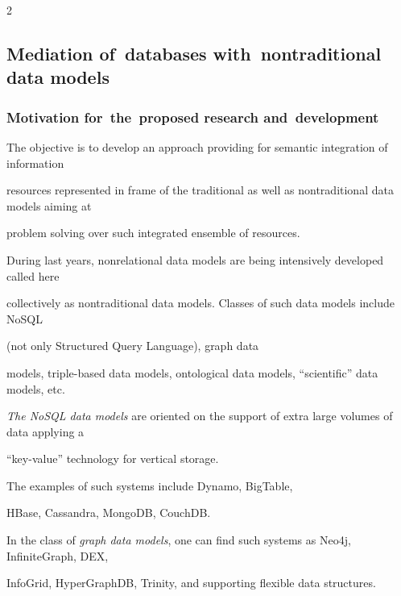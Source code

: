\begin{multicols}{2}
\begin{enumerate}[1.]
\end{enumerate}



\subsection{Mediation of~databases with~nontraditional data models}



\subsubsection{Motivation for~the~proposed research and~development}



\noindent

The objective is to develop an approach providing for semantic integration of information 

resources represented in frame of the traditional as well as nontraditional data models aiming at 

problem solving over such integrated ensemble of resources. 



During last years, nonrelational data models are being intensively developed called here 

collectively as nontraditional data models. Classes of such data models include NoSQL

(not only Structured Query Language), graph data 

models, triple-based data models, ontological data models, ``scientific'' data models, etc.



\textit{The NoSQL data models} are oriented on the support of extra large volumes of data applying a 

``key-value'' technology for vertical storage. 

The examples of such systems include Dynamo, BigTable, 

HBase, Cassandra, MongoDB, CouchDB.



In the class of \textit{graph data models}, one can find such systems as Neo4j, InfiniteGraph, DEX, 

InfoGrid, HyperGraphDB, Trinity, and supporting flexible data structures.



\begin{figure} %


\end{figure}
\end{multicols}
